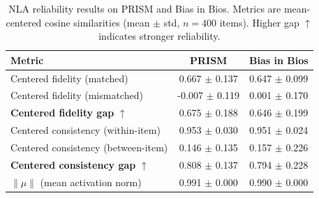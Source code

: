 \begin{table}[ht]
\centering
\caption{NLA reliability results on PRISM and Bias in Bios. Metrics are mean-centered cosine similarities (mean $\pm$ std, $n{=}400$ items). Higher gap $\uparrow$ indicates stronger reliability.}
\label{tab:nla_reliability}
\begin{tabular}{lcc}
\toprule
Metric & PRISM & Bias in Bios \\
\midrule
Centered fidelity (matched) & 0.667 $\pm$ 0.137 & 0.647 $\pm$ 0.099 \\
Centered fidelity (mismatched) & -0.007 $\pm$ 0.119 & 0.001 $\pm$ 0.170 \\
\textbf{Centered fidelity gap} $\uparrow$ & 0.675 $\pm$ 0.188 & 0.646 $\pm$ 0.199 \\
\midrule
Centered consistency (within-item) & 0.953 $\pm$ 0.030 & 0.951 $\pm$ 0.024 \\
Centered consistency (between-item) & 0.146 $\pm$ 0.135 & 0.157 $\pm$ 0.226 \\
\textbf{Centered consistency gap} $\uparrow$ & 0.808 $\pm$ 0.137 & 0.794 $\pm$ 0.228 \\
\midrule
$\|\mu\|$ (mean activation norm) & 0.991 $\pm$ 0.000 & 0.990 $\pm$ 0.000 \\
\bottomrule
\end{tabular}
\end{table}
